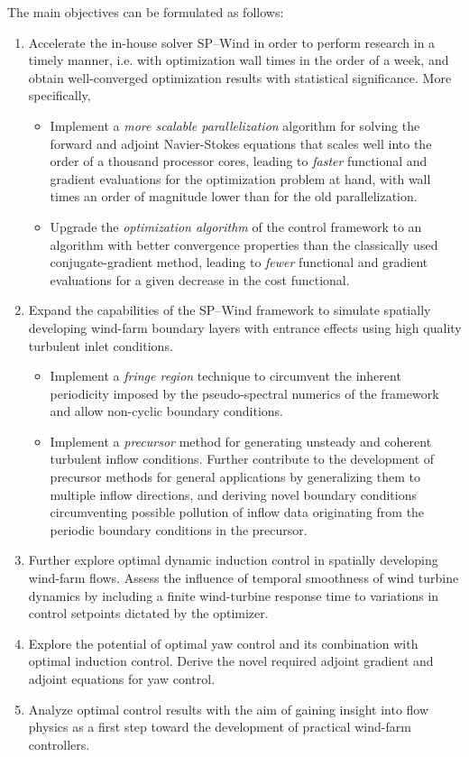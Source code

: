 The main objectives can be formulated as follows: 
\begin{enumerate}
	\item Accelerate the in-house solver SP--Wind in order to perform research in a timely manner, i.e. with optimization wall times in the order of a week, and obtain well-converged optimization results with statistical significance. More specifically, 
		\begin{itemize}
			\item Implement a  \emph{more scalable parallelization} algorithm for solving the forward and adjoint Navier-Stokes equations that scales well into the order of a thousand processor cores, leading to \emph{faster} functional and gradient evaluations for the optimization problem at hand, with wall times an order of magnitude lower than for the old parallelization.
			\item Upgrade the \emph{optimization algorithm} of the control framework to an algorithm with better convergence properties than the classically used conjugate-gradient method, leading to \emph{fewer} functional and gradient evaluations for a given decrease in the cost functional.
		\end{itemize}
	\item Expand the capabilities of the SP--Wind framework to simulate spatially developing wind-farm boundary layers with entrance effects using high quality turbulent inlet conditions.  
		\begin{itemize}
			\item Implement a \emph{fringe region} technique to circumvent the inherent periodicity imposed by the pseudo-spectral numerics of the framework and allow non-cyclic boundary conditions. 
			\item Implement a \emph{precursor} method for generating unsteady and coherent turbulent inflow conditions. Further contribute to the development of precursor methods for general applications by generalizing them to multiple inflow directions, and deriving novel boundary conditions circumventing possible pollution of inflow data originating from the periodic boundary conditions in the precursor.
		\end{itemize}
	\item Further explore optimal dynamic induction control in spatially developing wind-farm flows. Assess the influence of temporal smoothness of wind turbine dynamics by including a finite wind-turbine response time to variations in control setpoints dictated by the optimizer. 
	\item Explore the potential of optimal yaw control and its combination with optimal induction control. Derive the novel required adjoint gradient and adjoint equations for yaw control.
	\item Analyze optimal control results with the aim of gaining insight into flow physics as a first step toward the development of practical wind-farm controllers.
\end{enumerate}


